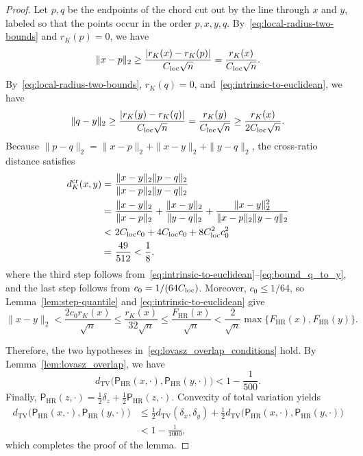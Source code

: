 \documentclass[11pt]{article}
\theoremstyle{definition}
\theoremstyle{remark}
\newcommand{\dtv}{d_{\mathrm{TV}}}
\newcommand{\HRzero}{\mathsf P_{\mathrm{HR}}}
\newcommand{\HR}{\mathsf P_{\mathrm{HR}}}
\newcommand{\rK}{r_K}
\begin{document}
\begin{proof}
Let $p,q$ be the endpoints of the chord cut out by the line through $x$ and
$y$, labeled so that the points occur in the order $p,x,y,q$. By~\eqref{eq:local-radius-two-bounds} and $\rK(p)=0$, we have
\begin{align}\label{eq:bound_x_to_p}
    \|x-p\|_2\ge \frac{|\rK(x)-\rK(p)|}{C_{\rm loc}\sqrt{n}}=\frac{\rK(x)}{C_{\mathrm{loc}}\sqrt n}.
\end{align}
By~\eqref{eq:local-radius-two-bounds}, $\rK(q)=0$, and~\eqref{eq:intrinsic-to-euclidean}, we have
\begin{align}\label{eq:bound_q_to_y}
    \|q-y\|_2 \geq \frac{|\rK(y)-\rK(q)|}{C_{\rm loc}\sqrt{n}}=\frac{\rK(y)}{C_{\mathrm{loc}}\sqrt n}\geq \frac{\rK(x)}{2C_{\mathrm{loc}}\sqrt n}.
\end{align}
Because $\|p-q\|_2=\|x-p\|_2+\|x-y\|_2+\|y-q\|_2$, the cross-ratio distance satisfies
\begin{align*}
 d_K^{\mathrm{cr}}(x,y)=&~
 \frac{\|x-y\|_2\|p-q\|_2}{\|x-p\|_2\|y-q\|_2}\\
 = &~
 \frac{\|x-y\|_2}{\|x-p\|_2}+\frac{\|x-y\|_2}{\|y-q\|_2}+\frac{\|x-y\|_2^2}{\|x-p\|_2\|y-q\|_2}\\
 < &~ 2C_{\rm loc} c_0 + 4C_{\rm loc} c_0 + 8C_{\mathrm{loc}}^2c_0^2 \\
 = &~  \frac{49}{512} < \frac{1}{8},
\end{align*}
where the third step follows from~\eqref{eq:intrinsic-to-euclidean}--\eqref{eq:bound_q_to_y}, and the last step follows from $c_0=1/(64C_{\rm loc})$.
Moreover, $c_0\le1/64$, so Lemma~\ref{lem:step-quantile} and
\eqref{eq:intrinsic-to-euclidean} give
\[
 \|x-y\|_2
 <
 \frac{2c_0\rK(x)}{\sqrt n}
 \le
 \frac{\rK(x)}{32\sqrt n}
 \le
 \frac{F_{\mathrm{HR}}(x)}{\sqrt n}
 <
 \frac2{\sqrt n}
 \max\{F_{\mathrm{HR}}(x),F_{\mathrm{HR}}(y)\}.
\]

Therefore, the two hypotheses in~\eqref{eq:lovasz_overlap_conditions} hold. By Lemma~\ref{lem:lovasz_overlap}, we have
\[
 \dtv\bigl(\HRzero(x,\cdot),\HRzero(y,\cdot)\bigr)
 <
 1-\frac1{500}.
\]
Finally, $\HR(z,\cdot)=\frac12\delta_z+\frac12\HRzero(z,\cdot)$.
Convexity of total variation yields
\begin{align*}
 \dtv\bigl(\HR(x,\cdot),\HR(y,\cdot)\bigr)
 &\le
 \frac12\dtv(\delta_x,\delta_y)
 +
 \frac12
 \dtv\bigl(\HRzero(x,\cdot),\HRzero(y,\cdot)\bigr)\\
 &<
 1-\frac1{1000},
\end{align*}
which completes the proof of the lemma.
\end{proof}
\end{document}
